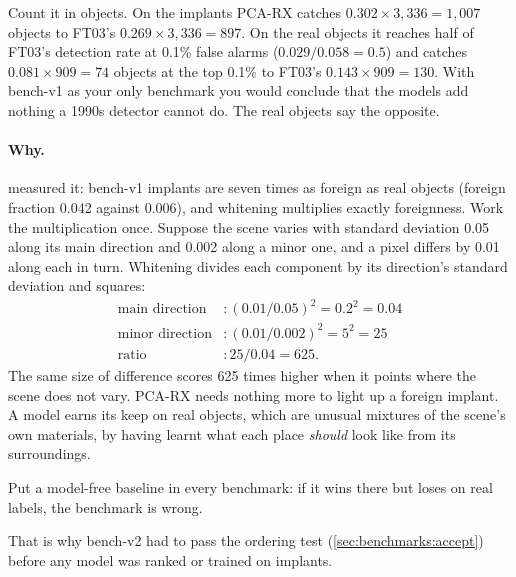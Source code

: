 Count it in objects. On the implants PCA-RX catches $0.302 \times 3{,}336 = 1{,}007$ objects to FT03's $0.269 \times
3{,}336 = 897$. On the real objects it reaches half of FT03's detection rate at 0.1\% false alarms ($0.029 / 0.058 =
0.5$) and catches $0.081 \times 909 = 74$ objects at the top 0.1\% to FT03's $0.143 \times 909 = 130$. With bench-v1
as your only benchmark you would conclude that the models add nothing a 1990s detector \citep{reed1990adaptive} cannot
do. The real objects say the opposite.


\paragraph{Why.}  measured it: bench-v1 implants are seven times as foreign as real objects (foreign
fraction 0.042 against 0.006), and whitening multiplies exactly foreignness. Work the multiplication once. Suppose the
scene varies with standard deviation 0.05 along its main direction and 0.002 along a minor one\tagA{}, and a pixel
differs by 0.01 along each in turn. Whitening divides each component by its direction's standard deviation and squares:
\begin{align*}
\text{main direction} &: (0.01 / 0.05)^2 = 0.2^2 = 0.04\\
\text{minor direction} &: (0.01 / 0.002)^2 = 5^2 = 25\\
\text{ratio} &: 25 / 0.04 = 625.
\end{align*}
The same size of difference scores 625 times higher when it points where the scene does not vary. PCA-RX needs nothing
more to light up a foreign implant. A model earns its keep on real objects, which are unusual mixtures of the scene's
own materials, by having learnt what each place \emph{should} look like from its surroundings.

\begin{keypoint}
Put a model-free baseline in every benchmark: if it wins there but loses on real labels, the benchmark is wrong.
\end{keypoint}

That is why bench-v2 had to pass the ordering test (\cref{sec:benchmarks:accept}) before any model was ranked or
trained on implants.


